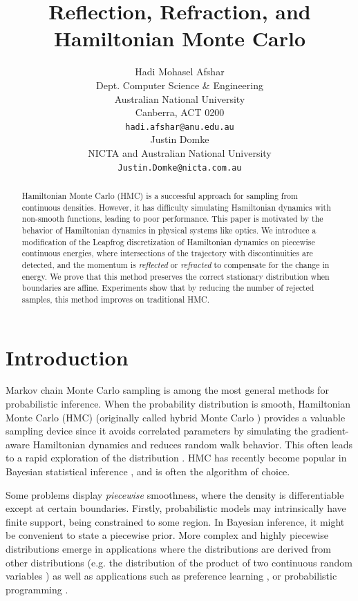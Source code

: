 \documentclass{article} %
\title{Reflection, Refraction, and Hamiltonian Monte Carlo}
\author{
Hadi Mohasel Afshar %
\\
Dept. Computer Science \& Engineering \\
Australian National University\\
Canberra, ACT 0200\\
\texttt{hadi.afshar@anu.edu.au} \\
\And
Justin Domke\\
NICTA and Australian National University\\
\texttt{Justin.Domke@nicta.com.au}
}
\begin{document}
\maketitle

\begin{abstract}
Hamiltonian Monte Carlo (HMC) is a successful approach for sampling from continuous densities.  However, it has difficulty simulating Hamiltonian dynamics with non-smooth functions, leading to poor performance.  This paper is motivated by the behavior of Hamiltonian dynamics in physical systems like optics.  We introduce a modification of the Leapfrog discretization of Hamiltonian dynamics on piecewise continuous energies, where intersections of the trajectory with discontinuities are detected, and the momentum is \emph{reflected} or \emph{refracted} to compensate for the change in energy.  We prove that this method preserves the correct stationary distribution when boundaries are affine.  Experiments show that by reducing the number of rejected samples, this method improves on traditional HMC.
\end{abstract}




\section{Introduction}

Markov chain Monte Carlo sampling is among the most general methods for probabilistic inference.  When the probability distribution is smooth, Hamiltonian Monte Carlo (HMC) (originally called hybrid Monte Carlo \cite{duane1987hybrid}) provides a valuable sampling device since it avoids correlated parameters  by simulating the gradient-aware Hamiltonian dynamics and reduces random walk behavior. This often leads to a rapid exploration of the distribution \cite{homan2014no, brooks2011handbook}.  HMC has recently become popular in Bayesian statistical inference \cite{stan-manual:2014}, and is often the algorithm of choice.



Some problems display \emph{piecewise} smoothness, where the density is differentiable except at certain boundaries.  Firstly, probabilistic models may intrinsically have finite support, being constrained to some region.  In Bayesian inference, it might be convenient to state a piecewise prior.  More complex and highly piecewise distributions emerge in applications where the distributions are derived from other distributions (e.g. the distribution of the product of two continuous random variables  \cite{ glen2004computing}) as well as  applications such as preference learning \cite{afshar2015linear}, or probabilistic programming \cite{lunn2009bugs}.
\end{document}
